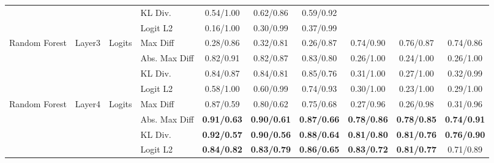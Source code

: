 \documentclass[border=2pt]{standalone}
\begin{document}
\begin{tabular}{llllcccccc}
 &  &  & KL Div. & 0.54/1.00 & 0.62/0.86 & 0.59/0.92 &  &  &  \\
 &  &  & Logit L2 & 0.16/1.00 & 0.30/0.99 & 0.37/0.99 &  &  &  \\
\midrule
Random Forest & Layer3 & Logits & Max Diff & 0.28/0.86 & 0.32/0.81 & 0.26/0.87 & 0.74/0.90 & 0.76/0.87 & 0.74/0.86 \\
 &  &  & Abs. Max Diff & 0.82/0.91 & 0.82/0.87 & 0.83/0.80 & 0.26/1.00 & 0.24/1.00 & 0.26/1.00 \\
 &  &  & KL Div. & 0.84/0.87 & 0.84/0.81 & 0.85/0.76 & 0.31/1.00 & 0.27/1.00 & 0.32/0.99 \\
 &  &  & Logit L2 & 0.58/1.00 & 0.60/0.99 & 0.74/0.93 & 0.30/1.00 & 0.23/1.00 & 0.29/1.00 \\
\midrule
Random Forest & Layer4 & Logits & Max Diff & 0.87/0.59 & 0.80/0.62 & 0.75/0.68 & 0.27/0.96 & 0.26/0.98 & 0.31/0.96 \\
 &  &  & Abs. Max Diff & \textbf{0.91/0.63} & \textbf{0.90/0.61} & \textbf{0.87/0.66} & \textbf{0.78/0.86} & \textbf{0.78/0.85} & \textbf{0.74/0.91} \\
 &  &  & KL Div. & \textbf{0.92/0.57} & \textbf{0.90/0.56} & \textbf{0.88/0.64} & \textbf{0.81/0.80} & \textbf{0.81/0.76} & \textbf{0.76/0.90} \\
 &  &  & Logit L2 & \textbf{0.84/0.82} & \textbf{0.83/0.79} & \textbf{0.86/0.65} & \textbf{0.83/0.72} & \textbf{0.81/0.77} & 0.71/0.89 \\
\bottomrule
\end{tabular}
\end{document}
